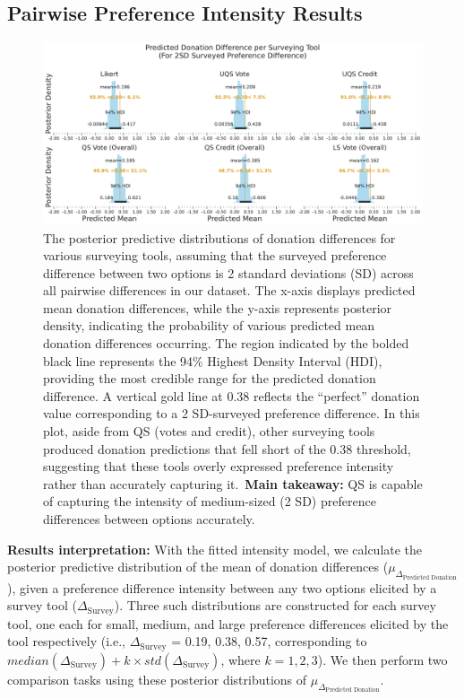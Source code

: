 \subsection{Pairwise Preference Intensity Results}
\label{sec:result_2}

\begin{figure}[h]
    \centering
    \includegraphics[width=\textwidth]{content/image/intensity_2sd.pdf}
    \caption{
    The posterior predictive distributions of donation differences for various surveying tools, assuming that the surveyed preference difference between two options is 2 standard deviations (SD) across all pairwise differences in our dataset. The x-axis displays predicted mean donation differences, while the y-axis represents posterior density, indicating the probability of various predicted mean donation differences occurring. The region indicated by the bolded black line represents the 94\% Highest Density Interval (HDI), providing the most credible range for the predicted donation difference. A vertical gold line at 0.38 reflects the ``perfect'' donation value corresponding to a 2 SD-surveyed preference difference. In this plot, aside from QS (votes and credit), other surveying tools produced donation predictions that fell short of the 0.38 threshold, suggesting that these tools overly expressed preference intensity rather than accurately capturing it.~\textbf{Main takeaway:} QS is capable of capturing the intensity of medium-sized (2 SD) preference differences between options accurately.
    }
    \label{fig:donation_posterior}
\end{figure}


\textbf{Results interpretation:} With the fitted intensity model, we calculate the posterior predictive distribution of the mean of donation differences ($\mu_{\Delta_{\text{Predicted Donation}}}$), given a preference difference intensity between any two options elicited by a survey tool ($\Delta_{\text{Survey}}$). Three such distributions are constructed for each survey tool, one each for small, medium, and large preference differences elicited by the tool respectively (i.e., $\Delta_{\text{Survey}}$ = 0.19, 0.38, 0.57, corresponding to $median(\Delta_{\text{Survey}})+k \times std(\Delta_{\text{Survey}})$, where $k=1, 2, 3$). We then perform two comparison tasks using these posterior distributions of $\mu_{\Delta_{\text{Predicted Donation}}}$. 

